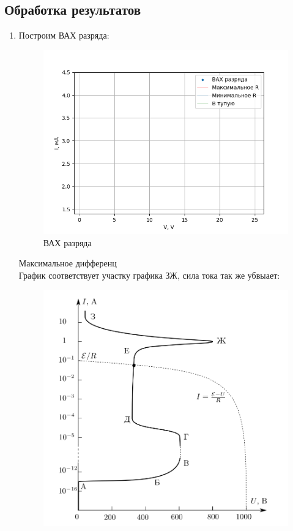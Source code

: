 \documentclass[12pt,a4paper]{article}
\begin{document}
\subsection*{Обработка результатов}
\begin{enumerate}
  \item Построим ВАХ разряда:
  \begin{figure}[H]
    \includegraphics*[width=\textwidth]{p1.png}
    \caption{ВАХ разряда}
    \label{fig:graph.p1}
  \end{figure}
  Максимальное дифференц%
  \\График соответствует участку графика ЗЖ, сила тока так же убвыает:
  \begin{figure}
    \includegraphics*[width=\textwidth]{2023-09-07-12-28-48.png}

\end{figure}
\end{enumerate}
\end{document}
